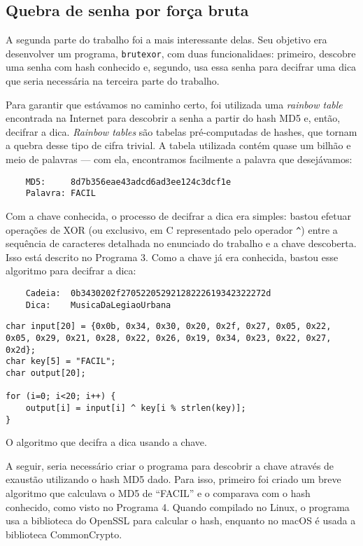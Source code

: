 \documentclass{sig-alternate-05-2015}
\begin{document}
\subsection{Quebra de senha por força bruta}
A segunda parte do trabalho foi a mais interessante delas.
Seu objetivo era desenvolver um programa, \texttt{brutexor}, com duas funcionalidaes: primeiro, descobre uma senha com hash conhecido e, segundo, usa essa senha para decifrar uma dica que seria necessária na terceira parte do trabalho.

Para garantir que estávamos no caminho certo, foi utilizada uma \textit{rainbow table} encontrada na Internet para descobrir a senha a partir do hash MD5 e, então, decifrar a dica.
\textit{Rainbow tables} são tabelas pré-computadas de hashes, que tornam a quebra desse tipo de cifra trivial.
A tabela utilizada contém quase um bilhão e meio de palavras — com ela, encontramos facilmente a palavra que desejávamos:

\begin{verbatim}
	MD5:     8d7b356eae43adcd6ad3ee124c3dcf1e
	Palavra: FACIL
\end{verbatim}

Com a chave conhecida, o processo de decifrar a dica era simples: bastou efetuar operações de XOR (ou exclusivo, em C representado pelo operador \texttt{\^}) entre a sequência de caracteres detalhada no enunciado do trabalho e a chave descoberta.
Isso está descrito no Programa 3.
Como a chave já era conhecida, bastou esse algoritmo para decifrar a dica:

\begin{verbatim}
	Cadeia:  0b3430202f27052205292128222619342322272d
	Dica:    MusicaDaLegiaoUrbana
\end{verbatim}

\begin{program}
\begin{lstlisting}
char input[20] = {0x0b, 0x34, 0x30, 0x20, 0x2f, 0x27, 0x05, 0x22, 0x05, 0x29, 0x21, 0x28, 0x22, 0x26, 0x19, 0x34, 0x23, 0x22, 0x27, 0x2d};
char key[5] = "FACIL";
char output[20];

for (i=0; i<20; i++) {
    output[i] = input[i] ^ key[i % strlen(key)];
}
\end{lstlisting}
\caption{O algoritmo que decifra a dica usando a chave.}
\end{program}

A seguir, seria necessário criar o programa para descobrir a chave através de exaustão utilizando o hash MD5 dado.
Para isso, primeiro foi criado um breve algoritmo que calculava o MD5 de ``FACIL'' e o comparava com o hash conhecido, como visto no Programa 4.
Quando compilado no Linux, o programa usa a biblioteca do OpenSSL para calcular o hash, enquanto no macOS é usada a biblioteca CommonCrypto.
\end{document}
